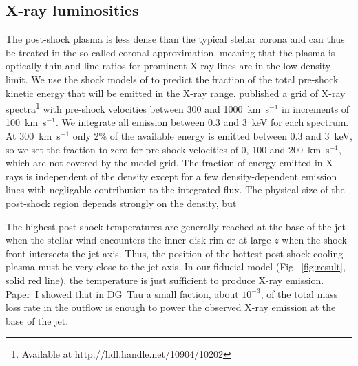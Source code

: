 \subsection{X-ray luminosities}
The post-shock plasma is less dense than the typical stellar corona and can thus be treated in the so-called coronal approximation, meaning that the plasma is optically thin and line ratios for prominent X-ray lines are in the low-density limit. We use the shock models of \citet{2007A&A...466.1111G} to predict the fraction of the total pre-shock kinetic energy that will be emitted in the X-ray range. \citet{2011AN....332..448G} published a grid of X-ray spectra\footnote{Available at http://hdl.handle.net/10904/10202} with pre-shock velocities between 300 and 1000~km~s$^{-1}$ in increments of 100~km~s$^{-1}$. We integrate all emission between 0.3 and 3~keV for each spectrum. At 300~km~s$^{-1}$ only 2\% of the available energy is emitted between 0.3 and 3~keV, so we set the fraction to zero for pre-shock velocities of 0, 100 and 200~km~s$^{-1}$, which are not covered by the model grid. The fraction of energy emitted in X-rays is independent of the density except for a few density-dependent emission lines with negligable contribution to the integrated flux. The physical size of the post-shock region depends strongly on the density, but


The highest post-shock temperatures are generally reached at the base of the jet when the stellar wind encounters the inner disk rim or at large $z$ when the shock front intersects the jet axis. Thus, the position of the hottest post-shock cooling plasma must be very close to the jet axis. In our fiducial model (Fig.~\ref{fig:result}, solid red line), the temperature is just sufficient to produce X-ray emission. Paper~I showed that in DG~Tau a small faction, about $10^{-3}$, of the total mass loss rate in the outflow is enough to power the observed X-ray emission at the base of the jet. 

